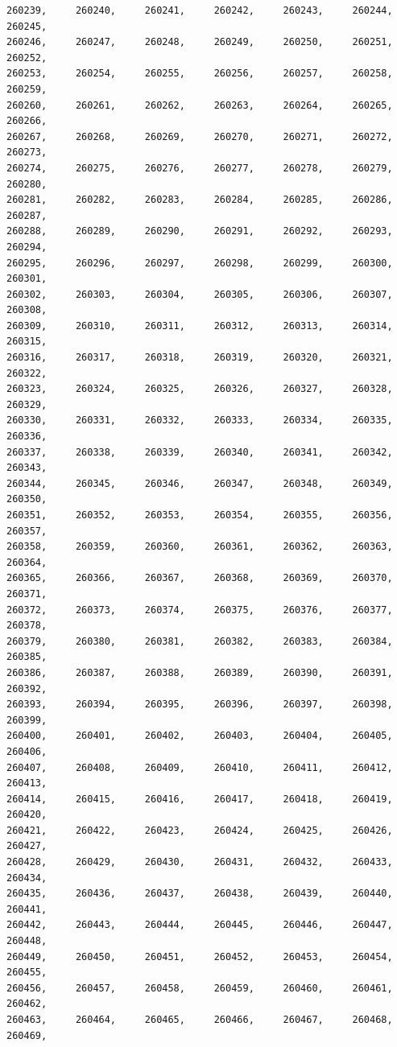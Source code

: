 \documentclass[a4paper,11pt]{report}
\begin{document}
\begin{verbatim}
260239,     260240,     260241,     260242,     260243,     260244,     260245,
260246,     260247,     260248,     260249,     260250,     260251,     260252,
260253,     260254,     260255,     260256,     260257,     260258,     260259,
260260,     260261,     260262,     260263,     260264,     260265,     260266,
260267,     260268,     260269,     260270,     260271,     260272,     260273,
260274,     260275,     260276,     260277,     260278,     260279,     260280,
260281,     260282,     260283,     260284,     260285,     260286,     260287,
260288,     260289,     260290,     260291,     260292,     260293,     260294,
260295,     260296,     260297,     260298,     260299,     260300,     260301,
260302,     260303,     260304,     260305,     260306,     260307,     260308,
260309,     260310,     260311,     260312,     260313,     260314,     260315,
260316,     260317,     260318,     260319,     260320,     260321,     260322,
260323,     260324,     260325,     260326,     260327,     260328,     260329,
260330,     260331,     260332,     260333,     260334,     260335,     260336,
260337,     260338,     260339,     260340,     260341,     260342,     260343,
260344,     260345,     260346,     260347,     260348,     260349,     260350,
260351,     260352,     260353,     260354,     260355,     260356,     260357,
260358,     260359,     260360,     260361,     260362,     260363,     260364,
260365,     260366,     260367,     260368,     260369,     260370,     260371,
260372,     260373,     260374,     260375,     260376,     260377,     260378,
260379,     260380,     260381,     260382,     260383,     260384,     260385,
260386,     260387,     260388,     260389,     260390,     260391,     260392,
260393,     260394,     260395,     260396,     260397,     260398,     260399,
260400,     260401,     260402,     260403,     260404,     260405,     260406,
260407,     260408,     260409,     260410,     260411,     260412,     260413,
260414,     260415,     260416,     260417,     260418,     260419,     260420,
260421,     260422,     260423,     260424,     260425,     260426,     260427,
260428,     260429,     260430,     260431,     260432,     260433,     260434,
260435,     260436,     260437,     260438,     260439,     260440,     260441,
260442,     260443,     260444,     260445,     260446,     260447,     260448,
260449,     260450,     260451,     260452,     260453,     260454,     260455,
260456,     260457,     260458,     260459,     260460,     260461,     260462,
260463,     260464,     260465,     260466,     260467,     260468,     260469,

\end{verbatim}
\end{document}
